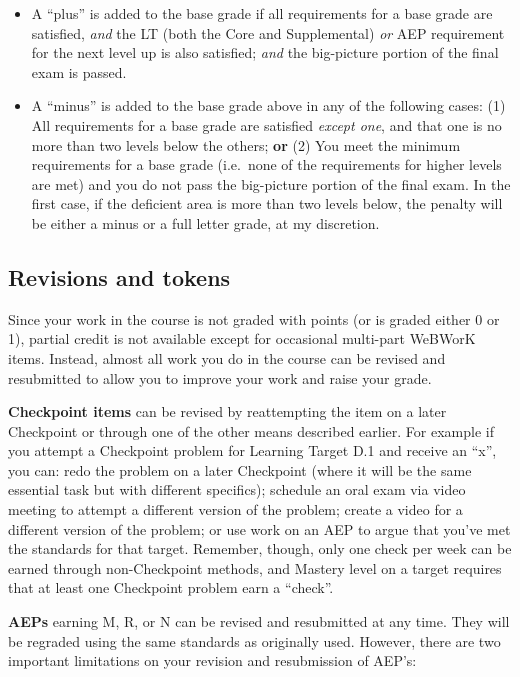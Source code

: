 \documentclass[]{article}
\providecommand{\tightlist}{%
  \setlength{\itemsep}{0pt}\setlength{\parskip}{0pt}}
\begin{document}
\begin{itemize}
\tightlist
\item
  A ``plus'' is added to the base grade if all requirements for a base
  grade are satisfied, \emph{and} the LT (both the Core and
  Supplemental) \emph{or} AEP requirement for the next level up is also
  satisfied; \emph{and} the big-picture portion of the final exam is
  passed.
\item
  A ``minus'' is added to the base grade above in any of the following
  cases: (1) All requirements for a base grade are satisfied
  \emph{except one}, and that one is no more than two levels below the
  others; \textbf{or} (2) You meet the minimum requirements for a base
  grade (i.e.~none of the requirements for higher levels are met) and
  you do not pass the big-picture portion of the final exam. In the
  first case, if the deficient area is more than two levels below, the
  penalty will be either a minus or a full letter grade, at my
  discretion.
\end{itemize}

\hypertarget{revisions-and-tokens}{%
\subsection{Revisions and tokens}\label{revisions-and-tokens}}

Since your work in the course is not graded with points (or is graded
either 0 or 1), partial credit is not available except for occasional
multi-part WeBWorK items. Instead, almost all work you do in the course
can be revised and resubmitted to allow you to improve your work and
raise your grade.

\textbf{Checkpoint items} can be revised by reattempting the item on a
later Checkpoint or through one of the other means described earlier.
For example if you attempt a Checkpoint problem for Learning Target D.1
and receive an ``x'', you can: redo the problem on a later Checkpoint
(where it will be the same essential task but with different specifics);
schedule an oral exam via video meeting to attempt a different version
of the problem; create a video for a different version of the problem;
or use work on an AEP to argue that you've met the standards for that
target. Remember, though, only one check per week can be earned through
non-Checkpoint methods, and Mastery level on a target requires that at
least one Checkpoint problem earn a ``check''.

\textbf{AEPs} earning M, R, or N can be revised and resubmitted at any
time. They will be regraded using the same standards as originally used.
However, there are two important limitations on your revision and
resubmission of AEP's:
\end{document}
